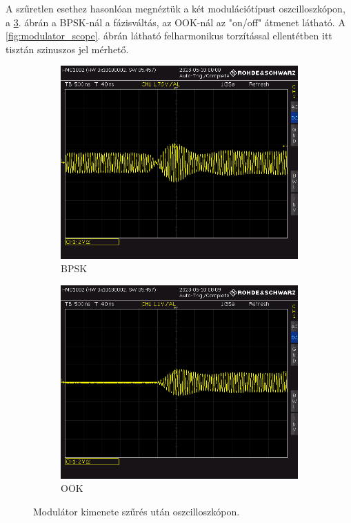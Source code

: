 A szűretlen esethez hasonlóan megnéztük a két modulációtípust oszcilloszkópon, a \ref{fig:modulator_szures_scope}. ábrán a BPSK-nál a fázisváltás, az OOK-nál az "on/off" átmenet látható. A \ref{fig:modulator_scope}. ábrán látható felharmonikus torzítással ellentétben itt tisztán szinuszos jel mérhető.

\begin{figure}[H]
	\centering
	\begin{subfigure}[b]{0.49\textwidth}
		\includegraphics[width=\textwidth,keepaspectratio]{kepek/SCOPE17.PNG}
		\caption{BPSK}
		\label{fig:modulator_bpsk_scope}
	\end{subfigure}
	\begin{subfigure}[b]{0.49\textwidth}
		\includegraphics[width=\textwidth,keepaspectratio]{kepek/SCOPE18.PNG}
		\caption{OOK}
		\label{fig:modulator_ook_scope}
	\end{subfigure}
	\caption{Modulátor kimenete szűrés után oszcilloszkópon.}
	\label{fig:modulator_szures_scope}
\end{figure}

